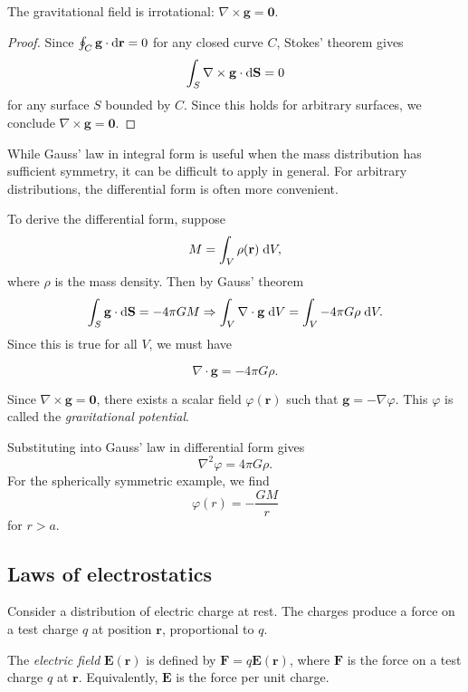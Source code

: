 \documentclass[a4paper]{article}
\begin{document}
\begin{prop}
  The gravitational field is irrotational: $\nabla\times \mathbf{g} = \mathbf{0}$.
\end{prop}
\begin{proof}
  Since $\oint_C \mathbf{g}\cdot \mathrm{d} \mathbf{r} = 0$ for any closed curve $C$, Stokes' theorem gives
  \[
    \int_S \nabla\times \mathbf{g}\cdot \mathrm{d} \mathbf{S} = 0
  \]
  for any surface $S$ bounded by $C$. Since this holds for arbitrary surfaces, we conclude $\nabla\times \mathbf{g} = \mathbf{0}$.
\end{proof}

\begin{rmk}
  While Gauss' law in integral form is useful when the mass distribution has sufficient symmetry, it can be difficult to apply in general. For arbitrary distributions, the differential form is often more convenient.
\end{rmk}

To derive the differential form, suppose
\[
  M = \int_V \rho(\mathbf{r})\;\mathrm{d} V,
\]
where $\rho$ is the mass density. Then by Gauss' theorem
\[
  \int_S \mathbf{g} \cdot \mathrm{d} \mathbf{S} = -4\pi GM \Rightarrow \int_V \nabla\cdot \mathbf{g}\;\mathrm{d} V = \int_V -4\pi G\rho \;\mathrm{d} V.
\]
Since this is true for all $V$, we must have
\begin{law}
  \[
    \nabla\cdot \mathbf{g} = -4\pi G\rho.
  \]
\end{law}
\begin{defi}
  Since $\nabla\times \mathbf{g} = \mathbf{0}$, there exists a scalar field $\varphi(\mathbf{r})$ such that $\mathbf{g} = -\nabla \varphi$. This $\varphi$ is called the \emph{gravitational potential}.
\end{defi}

Substituting into Gauss' law in differential form gives
\[
  \nabla^2 \varphi = 4\pi G\rho.
\]
For the spherically symmetric example, we find
\[
  \varphi(r) = -\frac{GM}{r}
\]
for $r > a$.
\subsection{Laws of electrostatics}
Consider a distribution of electric charge at rest. The charges produce a force on a test charge $q$ at position $\mathbf{r}$, proportional to $q$.

\begin{defi}
  The \emph{electric field} $\mathbf{E}(\mathbf{r})$ is defined by $\mathbf{F} = q\mathbf{E}(\mathbf{r})$, where $\mathbf{F}$ is the force on a test charge $q$ at $\mathbf{r}$. Equivalently, $\mathbf{E}$ is the force per unit charge.
\end{defi}
\end{document}
